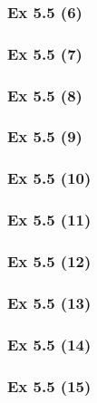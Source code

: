 \subsubsection{Ex 5.5 (6)}\label{sec:Ex_5.5.6}

\subsubsection{Ex 5.5 (7)}\label{sec:Ex_5.5.7}

\subsubsection{Ex 5.5 (8)}\label{sec:Ex_5.5.8}

\subsubsection{Ex 5.5 (9)}\label{sec:Ex_5.5.9}

\subsubsection{Ex 5.5 (10)}\label{sec:Ex_5.5.10}

\newpage		%

\subsubsection{Ex 5.5 (11)}\label{sec:Ex_5.5.11}

\subsubsection{Ex 5.5 (12)}\label{sec:Ex_5.5.12}

\subsubsection{Ex 5.5 (13)}\label{sec:Ex_5.5.13}

\subsubsection{Ex 5.5 (14)}\label{sec:Ex_5.5.14}

\subsubsection{Ex 5.5 (15)}\label{sec:Ex_5.5.15}

